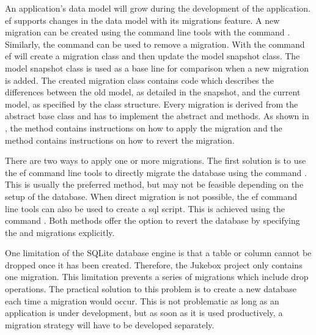 
An application's data model will grow during the development of the application. \gls{ef} supports changes in the data model with its migrations feature. A new migration can be created using the command line tools with the command . Similarly, the  command can be used to remove a migration. With the  command \gls{ef} will create a migration class and then update the model snapshot class. The model snapshot class is used as a base line for comparison when a new migration is added. The created migration class contains code which describes the differences between the old model, as detailed in the snapshot, and the current model, as specified by the class structure. Every migration is derived from the abstract base class  and has to implement the abstract  and  methods. As shown in , the  method contains instructions on how to apply the migration and the  method contains instructions on how to revert the migration. \cite{efMigrations}

There are two ways to apply one or more migrations. The first solution is to use the \gls{ef} command line tools to directly migrate the database using the command . This is usually the preferred method, but may not be feasible depending on the setup of the database. When direct migration is not possible, the \gls{ef} command line tools can also be used to create a \gls{sql} script. This is achieved using the command . Both methods offer the option to revert the database by specifying the  and  migrations explicitly.

One limitation of the SQLite database engine is that a table or column cannot be dropped once it has been created. Therefore, the Jukebox project only contains one migration. This limitation prevents a series of migrations which include drop operations. The practical solution to this problem is to create a new database each time a migration would occur. This is not problematic as long as an application is under development, but as soon as it is used productively, a migration strategy will have to be developed separately.



